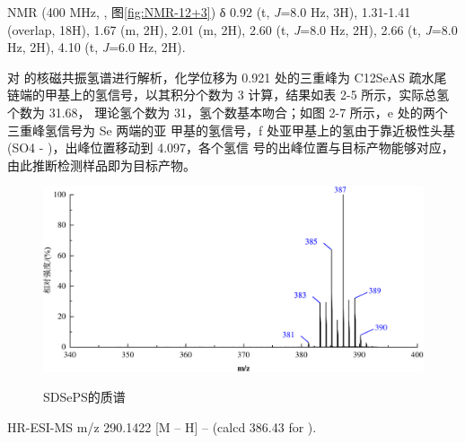 \documentclass[bachelor,fandolfonts,replaceperiod]{jnuthesis}
\begin{document}
     NMR (400 MHz, , 图\ref{fig:NMR-12+3}) δ 0.92 (t, \textit{J}=8.0 Hz, 3H), 1.31-1.41 (overlap, 18H), 1.67 (m, 2H), 2.01 (m, 2H), 2.60 (t, \textit{J}=8.0 Hz, 2H), 2.66 (t, \textit{J}=8.0 Hz, 2H),  4.10 (t, \textit{J}=6.0 Hz, 2H).
    
    对  的核磁共振氢谱进行解析，化学位移为 0.921 处的三重峰为 C12SeAS 疏水尾
    链端的甲基上的氢信号，以其积分个数为 3 计算，结果如表 2-5 所示，实际总氢个数为 31.68，
    理论氢个数为 31，氢个数基本吻合；如图 2-7 所示，e 处的两个三重峰氢信号为 Se 两端的亚
    甲基的氢信号，f 处亚甲基上的氢由于靠近极性头基(SO4 - )，出峰位置移动到 4.097，各个氢信
    号的出峰位置与目标产物能够对应，由此推断检测样品即为目标产物。
     \begin{figure}[H]
        \centering
        \includegraphics[width=.8\textwidth]{figure/mass123.pdf}\\
        \caption{SDSePS的质谱}\label{fig:mass-12+3}
    \end{figure}

HR-ESI-MS m/z 290.1422 [M – H] – (calcd 386.43 for ).
%
    
\end{document}
